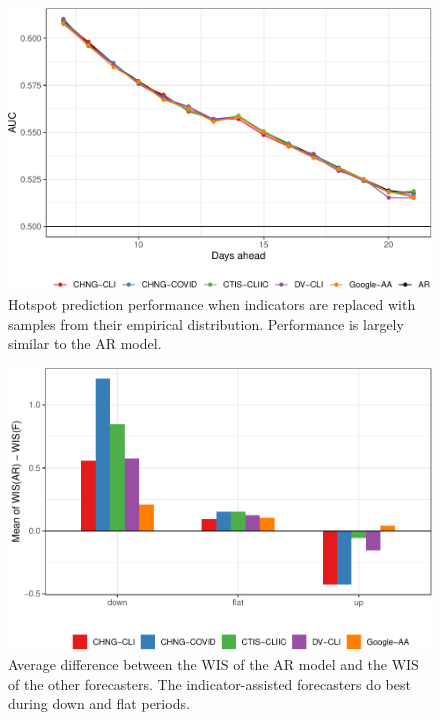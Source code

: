 \documentclass[9pt,twoside,lineno]{pnas-new}
\begin{document}
\clearpage

\begin{figure}

{\centering \includegraphics[width=\textwidth]{fig/hot-booted-1} 

}

\caption{Hotspot prediction performance when indicators are replaced with samples from their empirical distribution. Performance is largely similar to the AR model.}\label{fig:hot-booted}
\end{figure}

\clearpage

\begin{figure}

{\centering \includegraphics[width=\textwidth]{fig/upswing-summary-1} 

}

\caption{Average difference between the WIS of the AR model and the WIS of the other forecasters. The indicator-assisted forecasters do best during down and flat periods.}\label{fig:upswing-summary}
\end{figure}
\end{document}
